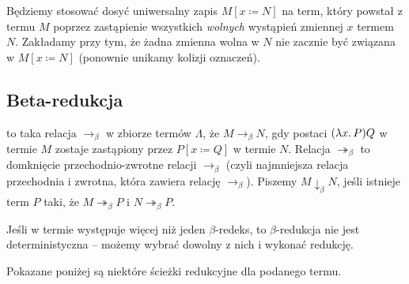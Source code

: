 \documentclass[polish,pretty]{angav}
\newcommand{\toto}{\twoheadrightarrow}
\begin{document}
Będziemy stosować dosyć uniwersalny zapis $M[x \coloneqq N]$ na term, który powstał z termu $M$ poprzez zastąpienie wszystkich \emph{wolnych} wystąpień zmiennej $x$ termem $N$.
Zakładamy przy tym, że żadna zmienna wolna w $N$ nie zacznie być związana w $M[x \coloneqq N]$ (ponownie unikamy kolizji oznaczeń).

\subsection{Beta-redukcja}

 to taka relacja $\to_\beta$ w zbiorze termów $\Lambda$, że $M \to_\beta N$, gdy  postaci $(\lambda x\ldotp P)Q$ w termie $M$ zostaje zastąpiony przez $P[x \coloneqq Q]$ w termie $N$.
Relacja $\toto_\beta$ to domknięcie przechodnio-zwrotne relacji $\to_\beta$ (czyli najmniejsza relacja przechodnia i zwrotna, która zawiera relację $\to_\beta$).
Piszemy $M \downarrow_\beta N$, jeśli istnieje term $P$ taki, że $M \toto_\beta P$ i $N \toto_\beta P$.

Jeśli w termie występuje więcej niż jeden $\beta$-redeks, to $\beta$-redukcja nie jest deterministyczna -- możemy wybrać dowolny z nich i wykonać redukcję.

\begin{example}
    \label{eq:beta-reduction}
    Pokazane poniżej są niektóre ścieżki redukcyjne dla podanego termu.
    \begin{center}
    \end{center}
\end{example}
\end{document}
